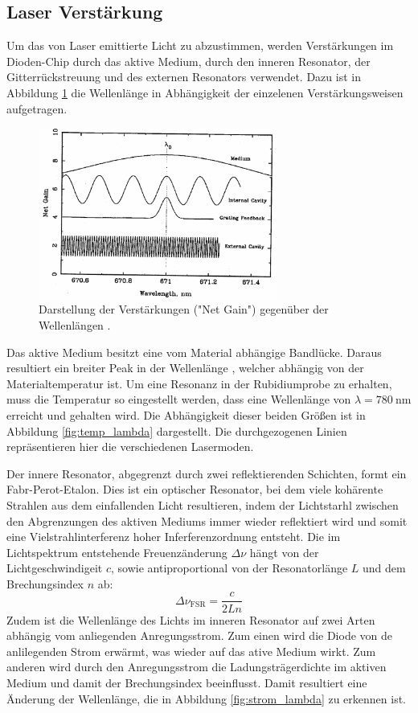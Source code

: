 \subsection{Laser Verstärkung}
Um das von Laser emittierte Licht zu abzustimmen, werden Verstärkungen im
Dioden-Chip durch das aktive Medium, durch den inneren Resonator, der Gitterrückstreuung
und des externen Resonators verwendet. Dazu ist in Abbildung \ref{fig:net_gain}
die Wellenlänge in Abhängigkeit der einzelenen Verstärkungsweisen aufgetragen.
\begin{figure}[htb]
  \centering
  \includegraphics[width=0.7\textwidth]{images/gain-lambda.pdf}
  \caption{Darstellung der Verstärkungen ("Net Gain") gegenüber der Wellenlängen
  \cite{anleitung}.}
  \label{fig:net_gain}
\end{figure}

Das aktive Medium besitzt eine vom Material abhängige Bandlücke. Daraus resultiert
ein breiter Peak in der Wellenlänge \lambda, welcher abhängig von der
Materialtemperatur ist. Um eine Resonanz in der Rubidiumprobe zu erhalten, muss
die Temperatur so eingestellt werden, dass eine Wellenlänge von $\lambda = \SI{780}{\nano\meter}$
erreicht und gehalten wird. Die Abhängigkeit dieser beiden Größen ist in Abbildung
\ref{fig:temp_lambda} dargestellt. Die durchgezogenen Linien repräsentieren hier
die verschiedenen Lasermoden.

Der innere Resonator, abgegrenzt durch zwei reflektierenden Schichten, formt ein
Fabr-Perot-Etalon. Dies ist ein optischer Resonator, bei dem viele kohärente Strahlen
aus dem einfallenden Licht resultieren, indem der Lichtstarhl zwischen den
Abgrenzungen des aktiven Mediums immer wieder reflektiert wird und somit eine
Vielstrahlinterferenz hoher Inferferenzordnung entsteht. Die im Lichtspektrum
entstehende Freuenzänderung $\Delta\nu$ hängt von der Lichtgeschwindigeit $c$,
sowie antiproportional von der Resonatorlänge $L$ und dem Brechungsindex $n$ ab:
\begin{equation}
  \Delta\nu_\text{FSR} = \frac{c}{2Ln}
\end{equation}
Zudem ist die Wellenlänge des Lichts im inneren Resonator auf zwei Arten abhängig
vom anliegenden Anregungsstrom. Zum einen wird die Diode von de anlilegenden Strom
erwärmt, was wieder auf das ative Medium wirkt. Zum anderen wird durch den Anregungsstrom
die Ladungsträgerdichte im aktiven Medium und damit der Brechungsindex beeinflusst.
Damit resultiert eine Änderung der Wellenlänge, die in Abbildung \ref{fig:strom_lambda}
zu erkennen ist.

